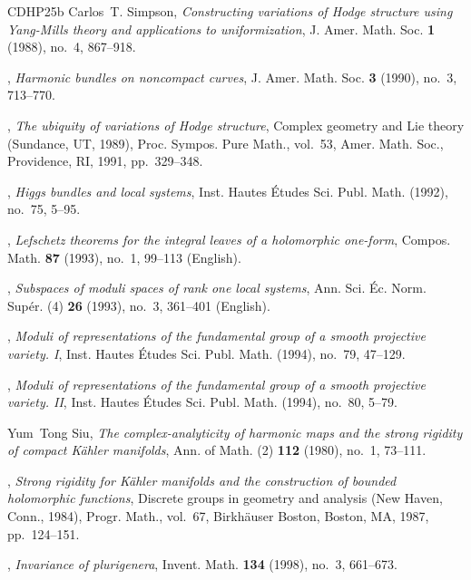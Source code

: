 \documentclass[english]{amsproc}
\theoremstyle{plain}
\theoremstyle{definition}
\theoremstyle{remark}
\theoremstyle{plain}
\numberwithin{equation}{thm} %
\begin{document}
\begin{thebibliography}{CDHP25b}
		Carlos~T. Simpson, \emph{Constructing variations of {H}odge structure using
			{Y}ang-{M}ills theory and applications to uniformization}, J. Amer. Math.
		Soc. \textbf{1} (1988), no.~4, 867--918. 
		
		\bysame, \emph{Harmonic bundles on noncompact curves}, J. Amer. Math. Soc.
		\textbf{3} (1990), no.~3, 713--770. 
		
		\bysame, \emph{The ubiquity of variations of {H}odge structure}, Complex
		geometry and {L}ie theory ({S}undance, {UT}, 1989), Proc. Sympos. Pure Math.,
		vol.~53, Amer. Math. Soc., Providence, RI, 1991, pp.~329--348. 
		
		\bysame, \emph{Higgs bundles and local systems}, Inst. Hautes \'{E}tudes Sci.
		Publ. Math. (1992), no.~75, 5--95. 
		
		\bysame, \emph{Lefschetz theorems for the integral leaves of a holomorphic
			one-form}, Compos. Math. \textbf{87} (1993), no.~1, 99--113 (English).
		
		\bysame, \emph{Subspaces of moduli spaces of rank one local systems}, Ann. Sci.
		{\'E}c. Norm. Sup{\'e}r. (4) \textbf{26} (1993), no.~3, 361--401 (English).
		
		\bysame, \emph{Moduli of representations of the fundamental group of a smooth
			projective variety. {I}}, Inst. Hautes \'Etudes Sci. Publ. Math. (1994),
		no.~79, 47--129. 
		
		\bysame, \emph{Moduli of representations of the fundamental group of a smooth
			projective variety. {II}}, Inst. Hautes \'Etudes Sci. Publ. Math. (1994),
		no.~80, 5--79. 
		
		Yum~Tong Siu, \emph{The complex-analyticity of harmonic maps and the strong
			rigidity of compact {K}\"ahler manifolds}, Ann. of Math. (2) \textbf{112}
		(1980), no.~1, 73--111. 
		
		\bysame, \emph{Strong rigidity for {K}\"ahler manifolds and the construction of
			bounded holomorphic functions}, Discrete groups in geometry and analysis
		({N}ew {H}aven, {C}onn., 1984), Progr. Math., vol.~67, Birkh\"auser Boston,
		Boston, MA, 1987, pp.~124--151. 
		
		\bysame, \emph{Invariance of plurigenera}, Invent. Math. \textbf{134} (1998),
		no.~3, 661--673. 
		

\end{thebibliography}
\end{document}
